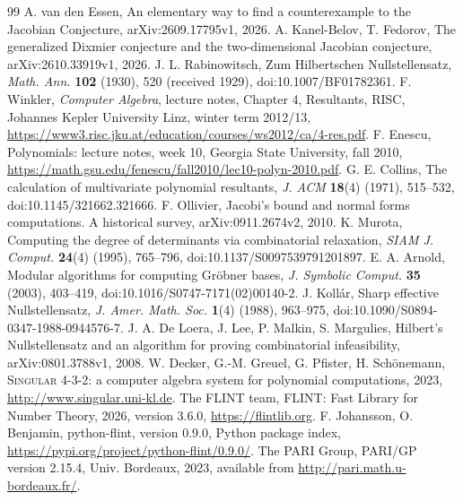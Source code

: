\documentclass[11pt]{article}
\theoremstyle{remark}
\begin{document}
\begin{thebibliography}{99}
 A. van den Essen, An elementary way to find a counterexample to the Jacobian Conjecture,
arXiv:2609.17795v1, 2026.
 A. Kanel-Belov, T. Fedorov, The generalized Dixmier conjecture and the two-dimensional
Jacobian conjecture, arXiv:2610.33919v1, 2026.
 J. L. Rabinowitsch, Zum Hilbertschen Nullstellensatz, \emph{Math. Ann.} \textbf{102} (1930), 520
(received 1929), doi:10.1007/BF01782361.
 F. Winkler, \emph{Computer Algebra}, lecture notes, Chapter 4, Resultants, RISC, Johannes Kepler University Linz,
winter term 2012/13, \url{https://www3.risc.jku.at/education/courses/ws2012/ca/4-res.pdf}.
 F. Enescu, Polynomials: lecture notes, week 10, Georgia State University, fall 2010,
\url{https://math.gsu.edu/fenescu/fall2010/lec10-polyn-2010.pdf}.
 G. E. Collins, The calculation of multivariate polynomial resultants, \emph{J. ACM} \textbf{18}(4) (1971),
515--532, doi:10.1145/321662.321666.
 F. Ollivier, Jacobi's bound and normal forms computations. A historical survey, arXiv:0911.2674v2, 2010.
 K. Murota, Computing the degree of determinants via combinatorial relaxation, \emph{SIAM J. Comput.}
\textbf{24}(4) (1995), 765--796, doi:10.1137/S0097539791201897.
 E. A. Arnold, Modular algorithms for computing Gr\"obner bases, \emph{J. Symbolic Comput.} \textbf{35} (2003),
403--419, doi:10.1016/S0747-7171(02)00140-2.
 J. Koll\'ar, Sharp effective Nullstellensatz, \emph{J. Amer. Math. Soc.} \textbf{1}(4) (1988), 963--975,
doi:10.1090/S0894-0347-1988-0944576-7.
 J. A. De Loera, J. Lee, P. Malkin, S. Margulies, Hilbert's Nullstellensatz and an algorithm for proving combinatorial
infeasibility, arXiv:0801.3788v1, 2008.
 W. Decker, G.-M. Greuel, G. Pfister, H. Sch\"onemann, \textsc{Singular} 4-3-2: a computer algebra system for
polynomial computations, 2023, \url{http://www.singular.uni-kl.de}.
 The FLINT team, FLINT: Fast Library for Number Theory, 2026, version 3.6.0, \url{https://flintlib.org}.
 F. Johansson, O. Benjamin, python-flint, version 0.9.0, Python package index,
\url{https://pypi.org/project/python-flint/0.9.0/}.
 The PARI Group, PARI/GP version 2.15.4, Univ. Bordeaux, 2023, available from \url{http://pari.math.u-bordeaux.fr/}.
\end{thebibliography}

\normalsize
\end{document}

